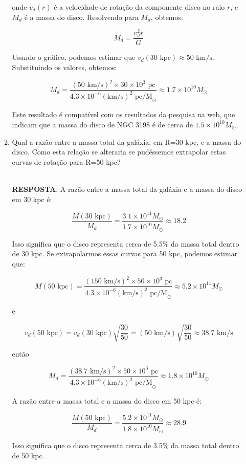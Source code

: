 \documentclass[a4paper,12pt]{article}
\begin{document}
\begin{enumerate}
\begin{enumerate}
onde $v_d(r)$ é a velocidade de rotação da componente disco no raio $r$, e $M_d$ é a massa do disco. Resolvendo para $M_d$, obtemos:

$$
M_d = \frac{v_d^2 r}{G}
$$

Usando o gráfico, podemos estimar que $v_d(30 \text{ kpc}) \approx 50 \text{ km/s}$. Substituindo os valores, obtemos:

$$
M_d = \frac{(50 \text{ km/s})^2 \times 30 \times 10^3 \text{ pc}}{4.3 \times 10^{-6} (\text{km/s})^2 \text{ pc/M}_\odot} \approx 1.7 \times 10^{10} M_\odot
$$

Este resultado é compatível com os resultados da pesquisa na web, que indicam que a massa do disco de NGC 3198 é de cerca de $1.5 \times 10^{10} M_\odot$.

\noindent\hrulefill

\item Qual a razão entre a massa total da galáxia, em R=30 kpc, e a massa do 
disco. Como esta relação se alteraria se pudéssemos extrapolar estas curvas 
de rotação para R=50 kpc?

\noindent\hrulefill\\\textbf{RESPOSTA}: A razão entre a massa total da galáxia e a massa do disco em 30 kpc é:

$$
\frac{M(30 \text{ kpc})}{M_d} = \frac{3.1 \times 10^{11} M_\odot}{1.7 \times 10^{10} M_\odot} \approx 18.2
$$

Isso significa que o disco representa cerca de 5.5\% da massa total dentro de 30 kpc. Se extrapolarmos essas curvas para 50 kpc, podemos estimar que:

$$
M(50 \text{ kpc}) = \frac{(150 \text{ km/s})^2 \times 50 \times 10^3 \text{ pc}}{4.3 \times 10^{-6} (\text{km/s})^2 \text{ pc/M}_\odot} \approx 5.2 \times 10^{11} M_\odot
$$

e

$$
v_d(50 \text{ kpc}) = v_d(30 \text{ kpc})\sqrt{\frac{30}{50}} = (50\text { km/s})\sqrt{\frac{30}{50}}\approx 38.7\text { km/s}
$$

então

$$
M_d = \frac{(38.7\text { km/s})^2\times50\times10^3\text { pc}} {4.3\times10^{-6}(\text {km/s})^2\text { pc/M}_\odot}\approx1.8\times10^{10}M_\odot
$$

A razão entre a massa total e a massa do disco em 50 kpc é:

$$
\frac{M(50\text { kpc})}{M_d}=\frac {5.2\times10^{11}M_\odot}{1.8\times10^{10}M_\odot}\approx28.9
$$

Isso significa que o disco representa cerca de 3.5\% da massa total dentro de 50 kpc.


\end{enumerate}
\end{enumerate}
\end{document}
